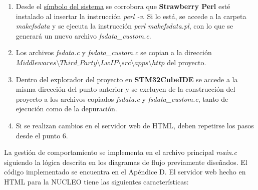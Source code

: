 \begin{enumerate}
    \item Desde el \underline{símbolo del sistema} se corrobora que \textbf{Strawberry Perl} esté instalado al insertar la instrucción \textit{perl -v}. Si lo está, se accede a la carpeta \textit{makefsdata} y se ejecuta la instrucción \textit{perl makefsdata.pl}, con lo que se generará un nuevo archivo \textit{fsdata\_custom.c}.
    \item Los archivos \textit{fsdata.c} y \textit{fsdata\_custom.c} se copian a la dirección $ Middlewares\setminus Third\_Party\setminus LwIP\setminus src\setminus apps\setminus http $ del proyecto.
    \item Dentro del explorador del proyecto en \textbf{STM32CubeIDE} se accede a la misma dirección del punto anterior y se excluyen de la construcción del proyecto a los archivos copiados \textit{fsdata.c} y \textit{fsdata\_custom.c}, tanto de ejecución como de la depuración.
    \item Si se realizan cambios en el servidor web de HTML, deben repetirse los pasos desde el punto 6.
\end{enumerate}

La gestión de comportamiento se implementa en el archivo principal \textit{main.c} siguiendo la lógica descrita en los diagramas de flujo previamente diseñados. El código implementado se encuentra en el Apéndice D. El servidor web hecho en HTML para la NUCLEO tiene las siguientes características:

